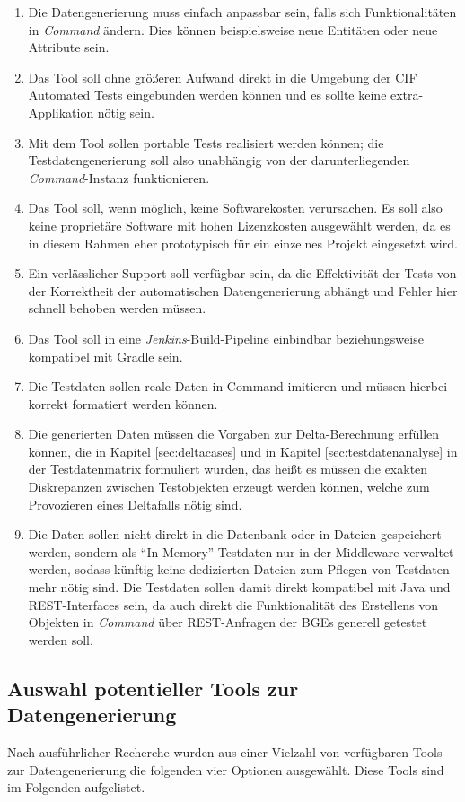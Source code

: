 \begin{enumerate}
    \item Die Datengenerierung muss einfach anpassbar sein, falls sich Funktionalitäten in \textit{Command} ändern. Dies können beispielsweise neue Entitäten oder neue Attribute sein.
    \item Das Tool soll ohne größeren Aufwand direkt in die Umgebung der \ac{CIF} Automated Tests eingebunden werden können und es sollte keine extra-Applikation nötig sein.
    \item Mit dem Tool sollen portable Tests realisiert werden können; die Testdatengenerierung soll also unabhängig von der darunterliegenden \textit{Command}-Instanz funktionieren.
    \item Das Tool soll, wenn möglich, keine Softwarekosten verursachen. Es soll also keine proprietäre Software mit hohen Lizenzkosten ausgewählt werden, da es in diesem Rahmen eher prototypisch für ein einzelnes Projekt eingesetzt wird.
    \item Ein verlässlicher Support soll verfügbar sein, da die Effektivität der Tests von der Korrektheit der automatischen Datengenerierung abhängt und Fehler hier schnell behoben werden müssen.
    \item Das Tool soll in eine \textit{Jenkins}-Build-Pipeline einbindbar beziehungsweise kompatibel mit Gradle sein.
    \item Die Testdaten sollen reale Daten in Command imitieren und müssen hierbei korrekt formatiert werden können.
    \item Die generierten Daten müssen die Vorgaben zur Delta-Berechnung erfüllen können, die in Kapitel \ref{sec:deltacases} und in Kapitel \ref{sec:testdatenanalyse} in der Testdatenmatrix formuliert wurden, das heißt es müssen die exakten Diskrepanzen zwischen Testobjekten erzeugt werden können, welche zum Provozieren eines Deltafalls nötig sind.
    \item Die Daten sollen nicht direkt in die Datenbank oder in Dateien gespeichert werden, sondern als \enquote{In-Memory}-Testdaten nur in der Middleware verwaltet werden, sodass künftig keine dedizierten Dateien zum Pflegen von Testdaten mehr nötig sind. Die Testdaten sollen damit direkt kompatibel mit Java und \ac{REST}-Interfaces sein, da auch direkt die Funktionalität des Erstellens von Objekten in \textit{Command} über \ac{REST}-Anfragen der \ac{BGE}s generell getestet werden soll.
\end{enumerate}

\subsection{Auswahl potentieller Tools zur Datengenerierung}\label{toolanalysauswahl}
Nach ausführlicher Recherche wurden aus einer Vielzahl von verfügbaren Tools zur Datengenerierung die folgenden vier Optionen ausgewählt. Diese Tools sind im Folgenden aufgelistet.

